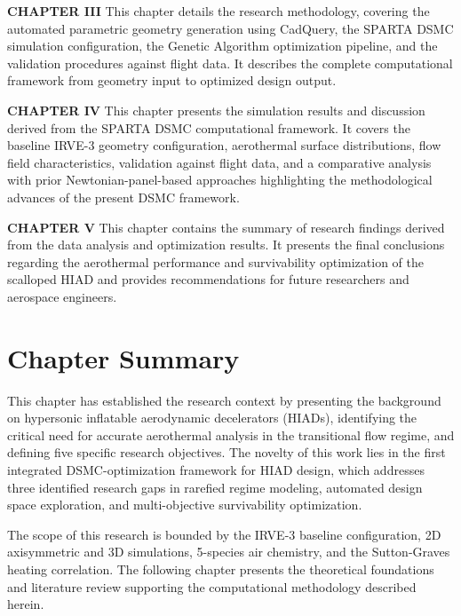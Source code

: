 \textbf{CHAPTER III} This chapter details the research methodology, covering the automated parametric geometry generation using CadQuery, the SPARTA DSMC simulation configuration, the Genetic Algorithm optimization pipeline, and the validation procedures against flight data. It describes the complete computational framework from geometry input to optimized design output.

\textbf{CHAPTER IV} This chapter presents the simulation results and discussion derived from the SPARTA DSMC computational framework. It covers the baseline IRVE-3 geometry configuration, aerothermal surface distributions, flow field characteristics, validation against flight data, and a comparative analysis with prior Newtonian-panel-based approaches highlighting the methodological advances of the present DSMC framework.

\textbf{CHAPTER V} This chapter contains the summary of research findings derived from the data analysis and optimization results. It presents the final conclusions regarding the aerothermal performance and survivability optimization of the scalloped HIAD and provides recommendations for future researchers and aerospace engineers.

\section*{Chapter Summary}
This chapter has established the research context by presenting the background on hypersonic inflatable aerodynamic decelerators (HIADs), identifying the critical need for accurate aerothermal analysis in the transitional flow regime, and defining five specific research objectives. The novelty of this work lies in the first integrated DSMC-optimization framework for HIAD design, which addresses three identified research gaps in rarefied regime modeling, automated design space exploration, and multi-objective survivability optimization.

The scope of this research is bounded by the IRVE-3 baseline configuration, 2D axisymmetric and 3D simulations, 5-species air chemistry, and the Sutton-Graves heating correlation. The following chapter presents the theoretical foundations and literature review supporting the computational methodology described herein.

